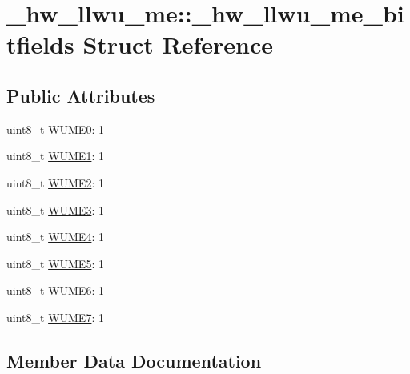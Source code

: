 \hypertarget{struct__hw__llwu__me_1_1__hw__llwu__me__bitfields}{}\section{\+\_\+hw\+\_\+llwu\+\_\+me\+:\+:\+\_\+hw\+\_\+llwu\+\_\+me\+\_\+bitfields Struct Reference}
\label{struct__hw__llwu__me_1_1__hw__llwu__me__bitfields}
\subsection*{Public Attributes}
\begin{DoxyCompactItemize}
\item 
uint8\+\_\+t \hyperlink{struct__hw__llwu__me_1_1__hw__llwu__me__bitfields_ac998606bcbbc615ccc4af6b6af0f77d4}{W\+U\+M\+E0}\+: 1
\item 
uint8\+\_\+t \hyperlink{struct__hw__llwu__me_1_1__hw__llwu__me__bitfields_a276ed857267bdbc60086c83567047759}{W\+U\+M\+E1}\+: 1
\item 
uint8\+\_\+t \hyperlink{struct__hw__llwu__me_1_1__hw__llwu__me__bitfields_ac23025a4b3ded4c378bd377b8d10da80}{W\+U\+M\+E2}\+: 1
\item 
uint8\+\_\+t \hyperlink{struct__hw__llwu__me_1_1__hw__llwu__me__bitfields_ac4bff710122b915f9d37b79938125955}{W\+U\+M\+E3}\+: 1
\item 
uint8\+\_\+t \hyperlink{struct__hw__llwu__me_1_1__hw__llwu__me__bitfields_a1165cb0b9eb28b2e611ba1354757de8e}{W\+U\+M\+E4}\+: 1
\item 
uint8\+\_\+t \hyperlink{struct__hw__llwu__me_1_1__hw__llwu__me__bitfields_ac774f1aa0f7441b662042962ad74311e}{W\+U\+M\+E5}\+: 1
\item 
uint8\+\_\+t \hyperlink{struct__hw__llwu__me_1_1__hw__llwu__me__bitfields_a476931b76842b0d4d226ce94b72e1524}{W\+U\+M\+E6}\+: 1
\item 
uint8\+\_\+t \hyperlink{struct__hw__llwu__me_1_1__hw__llwu__me__bitfields_ac7dfa0e8f68b07c40fefb0c6a0147db0}{W\+U\+M\+E7}\+: 1
\end{DoxyCompactItemize}


\subsection{Member Data Documentation}
